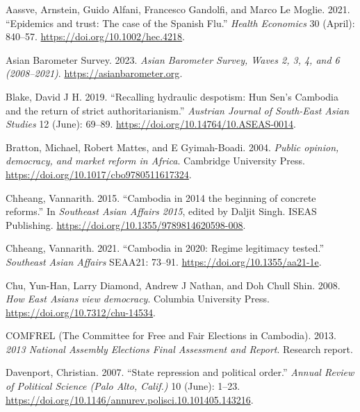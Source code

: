 \documentclass[
  12pt,
  letterpaper]{article}
\newlength{\cslhangindent}
\newenvironment{CSLReferences}[2] %
 {\begin{list}{}{%
  \setlength{\itemindent}{0pt}
  \setlength{\leftmargin}{0pt}
  \setlength{\parsep}{0pt}
  \ifodd #1
   \setlength{\leftmargin}{\cslhangindent}
   \setlength{\itemindent}{-1\cslhangindent}
  \fi
  \setlength{\itemsep}{#2\baselineskip}}}
 {\end{list}}
\begin{document}
\label{refs}
\begin{CSLReferences}{1}{1}
Aassve, Arnstein, Guido Alfani, Francesco Gandolfi, and Marco Le Moglie.
2021. {``{Epidemics and trust: The case of the Spanish Flu}.''}
\emph{Health Economics} 30 (April): 840--57.
\url{https://doi.org/10.1002/hec.4218}.

Asian Barometer Survey. 2023. \emph{{Asian Barometer Survey, Waves 2, 3,
4, and 6 (2008--2021)}}. \url{https://asianbarometer.org}.

Blake, David J H. 2019. {``{Recalling hydraulic despotism: Hun Sen's
Cambodia and the return of strict authoritarianism}.''} \emph{Austrian
Journal of South-East Asian Studies} 12 (June): 69--89.
\url{https://doi.org/10.14764/10.ASEAS-0014}.

Bratton, Michael, Robert Mattes, and E Gyimah-Boadi. 2004. \emph{{Public
opinion, democracy, and market reform in Africa}}. Cambridge University
Press. \url{https://doi.org/10.1017/cbo9780511617324}.

Chheang, Vannarith. 2015. {``{Cambodia in 2014 the beginning of concrete
reforms}.''} In \emph{{Southeast Asian Affairs 2015}}, edited by Daljit
Singh. ISEAS Publishing.
\url{https://doi.org/10.1355/9789814620598-008}.

Chheang, Vannarith. 2021. {``{Cambodia in 2020: Regime legitimacy
tested}.''} \emph{Southeast Asian Affairs} SEAA21: 73--91.
\url{https://doi.org/10.1355/aa21-1e}.

Chu, Yun-Han, Larry Diamond, Andrew J Nathan, and Doh Chull Shin. 2008.
\emph{{How East Asians view democracy}}. Columbia University Press.
\url{https://doi.org/10.7312/chu-14534}.

COMFREL (The Committee for Free and Fair Elections in Cambodia). 2013.
\emph{{2013 National Assembly Elections Final Assessment and Report}}.
Research report.

Davenport, Christian. 2007. {``{State repression and political
order}.''} \emph{Annual Review of Political Science (Palo Alto, Calif.)}
10 (June): 1--23.
\url{https://doi.org/10.1146/annurev.polisci.10.101405.143216}.


\end{CSLReferences}
\end{document}
